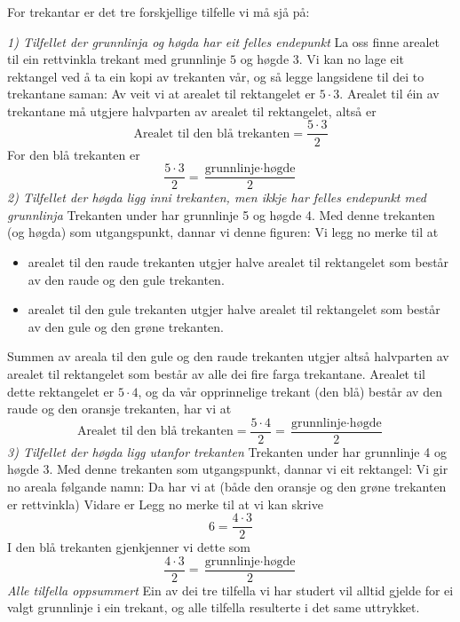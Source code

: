 \subsubsection{\artri \label{artri}}
For trekantar er det tre forskjellige tilfelle vi må sjå på: \vsk

\textit{1) Tilfellet der grunnlinja og høgda har eit felles endepunkt} \os
La oss finne arealet til ein rettvinkla trekant med grunnlinje $ 5 $ og høgde $ 3 $.
Vi kan no lage eit rektangel ved å ta ein kopi av trekanten vår, og så legge langsidene til dei to trekantane saman:
Av  veit vi at arealet til rektangelet er $ {5\cdot 3} $. Arealet til éin av trekantane må utgjere halvparten av arealet til rektangelet, altså er
\[ \text{Arealet til den blå trekanten} = \frac{5\cdot 3}{2} \]
For den blå trekanten er 
\[\frac{5\cdot3}{2}= \frac{\text{grunnlinje}\cdot \text{høgde}}{2} \]
\newpage
\textit{2) Tilfellet der høgda ligg inni trekanten, men ikkje har felles endepunkt med grunnlinja} \os
Trekanten under har grunnlinje 5 og høgde 4.
Med denne trekanten (og høgda) som utgangspunkt, dannar vi denne figuren:
Vi legg no merke til at
\begin{itemize}
	\item arealet til den raude trekanten utgjer halve arealet til rektangelet som består av den raude og den gule trekanten.
	\item arealet til den gule trekanten utgjer halve arealet til rektangelet som består av den gule og den grøne trekanten.
\end{itemize}
Summen av areala til den gule og den raude trekanten utgjer altså halvparten av arealet til rektangelet som består av alle dei fire farga trekantane. Arealet til dette rektangelet er $ 5\cdot4 $, og da vår opprinnelige trekant (den blå) består av den raude og den oransje trekanten, har vi at
\[ \text{Arealet til den blå trekanten}=\frac{5\cdot4}{2}=\frac{\text{grunnlinje}\cdot\text{høgde}}{2} \] 
\newpage
\textit{3) Tilfellet der høgda ligg utanfor trekanten} \os
Trekanten under har grunnlinje 4 og høgde 3. 
Med denne trekanten som utgangspunkt, dannar vi eit rektangel:
Vi gir no areala følgande namn:
Da har vi at (både den oransje og den grøne trekanten er rettvinkla)
Vidare er
Legg no merke til at vi kan skrive
\[ 6=\frac{4\cdot3}{2} \]
I den blå trekanten gjenkjenner vi dette som 
\[ \frac{4\cdot3}{2}=\frac{\text{grunnlinje}\cdot\text{høgde}}{2} \]
\newpage
\textit{Alle tilfella oppsummert}\os
Ein av dei tre tilfella vi har studert vil alltid  gjelde for ei valgt grunnlinje i ein trekant, og alle tilfella resulterte i det same uttrykket.\regv

